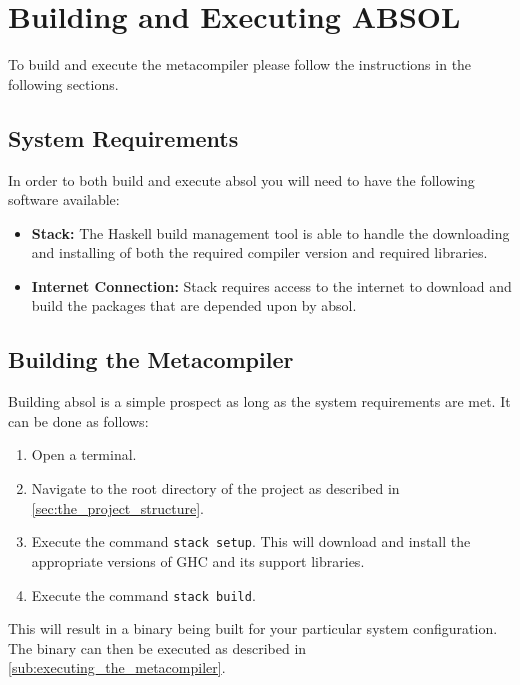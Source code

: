 
\section{Building and Executing ABSOL} %
\label{sec:building_and_executing_absol}
To build and execute the metacompiler please follow the instructions in the following sections.

\subsection{System Requirements} %
\label{sub:system_requirements}
In order to both build and execute \gls{absol} you will need to have the following software available:
\begin{itemize}
    \item \textbf{Stack:} The Haskell build management tool is able to handle the downloading and installing of both the required compiler version and required libraries.
    \item \textbf{Internet Connection:} Stack requires access to the internet to download and build the packages that are depended upon by \gls{absol}. 
\end{itemize}


\subsection{Building the Metacompiler} %
\label{sub:building_the_metacompiler}
Building \gls{absol} is a simple prospect as long as the system requirements are met.
It can be done as follows:
\begin{enumerate}
    \item Open a terminal.
    \item Navigate to the root directory of the project as described in \autoref{sec:the_project_structure}.
    \item Execute the command \texttt{stack setup}. This will download and install the appropriate versions of GHC and its support libraries. 
    \item Execute the command \texttt{stack build}. 
\end{enumerate}

This will result in a binary being built for your particular system configuration.
The binary can then be executed as described in \autoref{sub:executing_the_metacompiler}.

